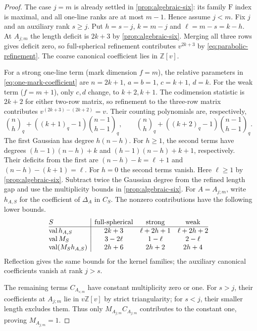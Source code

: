 \documentclass[a4paper,11pt]{amsart}
\numberwithin{equation}{subsection}
\theoremstyle{plain}
\theoremstyle{definition}
\theoremstyle{remark}
\newcommand{\gbinom}[2]{\binom{#1}{#2}}
\begin{document}
\begin{proof}
The case $j=m$ is already settled in \autoref{prop:algebraic-six}:
its family $\mathrm F$ index is maximal, and all one-line ranks
are at most $m-1$. Hence assume $j<m$.
Fix $j$ and an auxiliary rank $s\ge j$. Put $h=s-j$,
$k=m-j$ and $\ell=m-s=k-h$.
At $A_{j;m}$ the length deficit is $2k+3$ by \autoref{prop:algebraic-six}.
Merging all three rows gives deficit zero, so full-spherical refinement
contributes $v^{2k+3}$ by \autoref{eq:parabolic-refinement}. The coarse
canonical coefficient lies in $\mathbb Z[v]$.

For a strong one-line term (mark dimension $f=m$), the relative
parameters in \autoref{eq:one-mark-coefficient} are
$n=2k+1$, $a=b=1$, $c=k+1$, $d=k$.
For the weak term ($f=m+1$), only $c,d$ change, to $k+2,k+1$.
The codimension statistic is $2k+2$ for either two-row matrix,
so refinement to the three-row matrix contributes
$v^{(2k+3)-(2k+2)}=v$. Their counting polynomials are, respectively,
\[
\gbinom{n}{h}_{q}+((k+1)_q-1)\gbinom{n-1}{h-1}_{q},
\qquad
\gbinom{n}{h}_{q}+((k+2)_q-1)\gbinom{n-1}{h-1}_{q}.
\]
The first Gaussian has degree $h(n-h)$. For $h\ge1$,
the second terms have degrees $(h-1)(n-h)+k$ and
$(h-1)(n-h)+k+1$, respectively. Their deficits from the first are
$(n-h)-k=\ell+1$ and $(n-h)-(k+1)=\ell$.
For $h=0$ the second terms vanish.
Here $\ell\ge1$ by \autoref{prop:algebraic-six}.
Subtract twice the Gaussian degree from the refined length gap
and use the multiplicity bounds in \autoref{prop:algebraic-six}.
For $A=A_{j;m}$, write $h_{A,S}$ for the coefficient of $\Delta_A$ in $C_S$.
The nonzero contributions have the following lower bounds.
\[
\begin{array}{@{}l|ccc@{}}
 S & \text{full-spherical} & \text{strong} & \text{weak} \\\hline
 \operatorname{val} h_{A,S} & 2k+3 & \ell+2h+1 & \ell+2h+2\\
 \operatorname{val} M_S & 3-2\ell & 1-\ell & 2-\ell\\
 \operatorname{val}(M_S h_{A,S}) & 2h+6 & 2h+2 & 2h+4
\end{array}
\]
Reflection gives the same bounds for
the kernel families; the auxiliary canonical coefficients vanish
at rank $j>s$.

The remaining terms $C_{A_{s;m}}$ have constant
multiplicity zero or one. For $s>j$, their coefficients at
$A_{j;m}$ lie in $v\mathbb Z[v]$ by strict triangularity; for
$s<j$, their smaller length excludes them. Thus only
$M_{A_{j;m}}C_{A_{j;m}}$ contributes to the constant one, proving
$M_{A_{j;m}}=1$.
\end{proof}
\end{document}
